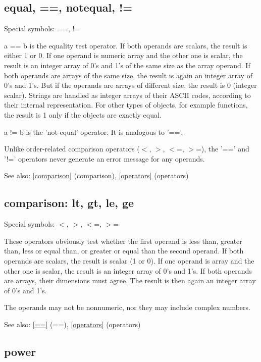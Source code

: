 \documentclass[a4paper]{article}
\begin{document}
\subsection{equal, ==, notequal, !=\label{==}}

Special symbols: ==, !=

a == b is the equality test operator. If both operands are scalars,
the result is either 1 or 0. If one operand is numeric array and the
other one is scalar, the result is an integer array of 0's and 1's of
the same size as the array operand. If both operands are arrays of the
same size, the result is again an integer array of 0's and 1's. But if
the operands are arrays of different size, the result is 0 (integer
scalar). Strings are handled as integer arrays of their ASCII codes,
according to their internal representation. For other types of
objects, for example functions, the result is 1 only if the objects
are exactly equal.

a != b is the 'not-equal' operator. It is analogous to '=='.

Unlike order-related comparison operators ({$<$}, {$>$}, {$<$}=, {$>$}=), the '==' and
'!=' operators never generate an error message for any operands.

See also: \ref{comparison} {(comparison)}, \ref{operators} {(operators)}




\subsection{comparison: lt, gt, le, ge\label{comparison}}

Special symbols: $<$, $>$, $<$=, $>$=

These operators obviously test whether the first operand is less than,
greater than, less or equal than, or greater or equal than the second
operand. If both operands are scalars, the result is scalar (1 or 0).
If one operand is array and the other one is scalar, the result is an
integer array of 0's and 1's. If both operands are arrays, their
dimensions must agree. The result is then again an integer array of
0's and 1's.

The operands may not be nonnumeric, nor they may include complex
numbers.

See also: \ref{==} {(==)}, \ref{operators} {(operators)}




\subsection{power\label{power}}
\end{document}
